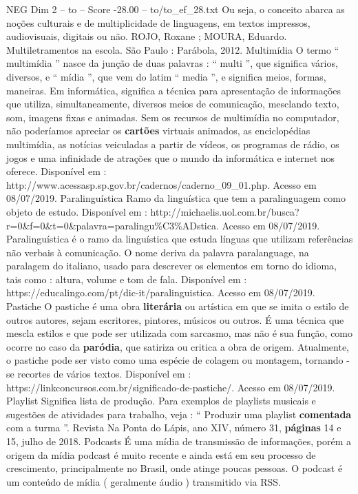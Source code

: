 \begin{textsample}{NEG Dim 2 – to – Score -28.00 – to/to\_ef\_28.txt}
Ou seja, o conceito abarca as noções culturais e de multiplicidade de linguagens, em textos impressos, audiovisuais, digitais ou não.
ROJO, Roxane ; MOURA, Eduardo.
Multiletramentos na escola.
São Paulo : Parábola, 2012.
Multimídia O termo “ multimídia ” nasce da junção de duas palavras : “ multi ”, que significa vários, diversos, e “ mídia ”, que vem do latim “ media ”, e significa meios, formas, maneiras.
Em informática, significa a técnica para apresentação de informações que utiliza, simultaneamente, diversos meios de comunicação, mesclando texto, som, imagens fixas e animadas.
Sem os recursos de multimídia no computador, não poderíamos apreciar os \textbf{cartões} virtuais animados, as enciclopédias multimídia, as notícias veiculadas a partir de vídeos, os programas de rádio, os jogos e uma infinidade de atrações que o mundo da informática e internet nos oferece.
Disponível em : http://www.acessasp.sp.gov.br/cadernos/caderno\_09\_01.php.
Acesso em 08/07/2019.
Paralinguística Ramo da linguística que tem a paralinguagem como objeto de estudo.
Disponível em : http://michaelis.uol.com.br/busca? r=0\&f=0\&t=0\&palavra=paralingu\%C3\%ADstica.
Acesso em 08/07/2019.
Paralinguística é o ramo da linguística que estuda línguas que utilizam referências não verbais à comunicação.
O nome deriva da palavra paralanguage, na paralagem do italiano, usado para descrever os elementos em torno do idioma, tais como : altura, volume e tom de fala.
Disponível em : https://educalingo.com/pt/dic-it/paralinguistica.
Acesso em 08/07/2019.
Pastiche O pastiche é uma obra \textbf{literária} ou artística em que se imita o estilo de outros autores, sejam escritores, pintores, músicos ou outros.
É uma técnica que mescla estilos e que pode ser utilizada com sarcasmo, mas não é sua função, como ocorre no caso da \textbf{paródia}, que satiriza ou critica a obra de origem.
Atualmente, o pastiche pode ser visto como uma espécie de colagem ou montagem, tornando -se recortes de vários textos.
Disponível em : https://linkconcursos.com.br/significado-de-pastiche/.
Acesso em 08/07/2019.
Playlist Significa lista de produção.
Para exemplos de playlists musicais e sugestões de atividades para trabalho, veja : “ Produzir uma playlist \textbf{comentada} com a turma ”.
Revista Na Ponta do Lápis, ano XIV, número 31, \textbf{páginas} 14 e 15, julho de 2018.
Podcasts É uma mídia de transmissão de informações, porém a origem da mídia podcast é muito recente e ainda está em seu processo de crescimento, principalmente no Brasil, onde atinge poucas pessoas.
O podcast é um conteúdo de mídia ( geralmente áudio ) transmitido via RSS.

\end{textsample}

